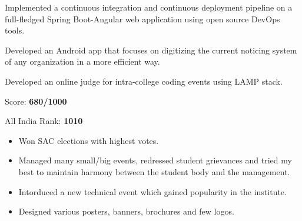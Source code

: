 \documentclass[10pt,a4paper,ragged2e,withhyper]{smitcv}
\begin{document}
\begin{paracol}{2}


Implemented a continuous integration and continuous deployment pipeline on a full-fledged Spring Boot-Angular web application using open source DevOps tools.

\divider

Developed an Android app that focuses on digitizing the current noticing system of any organization in a more efficient way.

\divider

Developed an online judge for intra-college coding events using LAMP stack.

\medskip

\divider

{}
\medskip
{\Large{\color{emphasis}Score: \textbf{\color{accent}680/1000}\par}}
\smallskip
{\Large{\color{emphasis}All India Rank: \textbf{\color{accent}1010}}}

\divider


\begin{itemize}
\item Won SAC elections with highest votes.
\item Managed many small/big events, redressed student grievances and tried my best to maintain harmony between the student body and the management.
\end{itemize}

\divider

\begin{itemize}
\item Intorduced a new technical event which gained popularity in the institute.
\item Designed various posters, banners, brochures and few logos.
\end{itemize}


\end{paracol}
\end{document}
